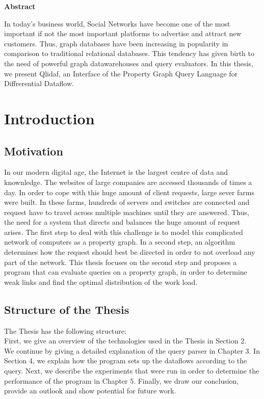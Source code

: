 \documentclass[11pt,singlecolumn]{scrartcl}
\begin{document}
\hspace{60mm}
\begin{center}
 \textbf{Abstract} \end{center}
In today's business world, Social Networks have become one of the most important if not the most important platforms to advertise and attract new customers. Thus, graph databases have been increasing in popularity in comparison to traditional relational databases. This tendency has given birth to the need of powerful graph datawarehouses and query evaluators. In this thesis, we present Qlidaf, an Interface of the Property Graph Query Language for Diffrerential Dataflow.

\clearpage
\tableofcontents
\clearpage
\listoffigures
\clearpage


\section{Introduction}
\subsection{Motivation}
In our modern digital age, the Internet is the largest centre of data and knownledge. The websites of large companies are accessed thousands of times a day. In order to cope with this huge amount of client requests, large sever farms were built. In these farms, hundreds of servers and switches are connected and request have to travel across multiple machines until they are answered. Thus, the need for a system that directs and balances the huge amount of request arises. The first step to deal with this challenge is to model this complicated network of computers as a property graph. In a second step, an algorithm determines how the request should best be directed in order to not overload any part of the network. This thesis focuses on the second step and proposes a program that can evaluate queries on a property graph, in order to determine weak links and find the optimal distribution of the work load.
\subsection{Structure of the Thesis}
The Thesis has the following structure:\\
First, we give an overview of the technologies used in the Thesis in Section 2.\\
We continue by giving a detailed explanation of the query parser  in Chapter 3. In Section 4, we explain how the program sets up the dataflows according to the query. Next, we describe the experiments that were run in order to determine the performance of the program in Chapter 5. Finally, we draw our conclusion, provide an outlook and show potential for future work.
\clearpage
\end{document}
